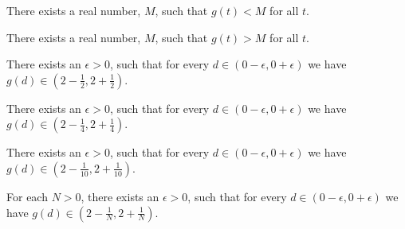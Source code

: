 \documentclass{ximera}
\begin{document}
\begin{exercise}
\begin{question} 

There exists a real number, $M$, such that $g(t) < M$ for all $t$.
\begin{multipleChoice}
\end{multipleChoice}

\end{question}





\begin{question} 

There exists a real number, $M$, such that $g(t) > M$ for all $t$.
\begin{multipleChoice}
\end{multipleChoice}

\end{question}










\begin{question} 

There exists an $\epsilon > 0$, such that for every $d \in (0-\epsilon, 0+\epsilon)$ we have $g(d) \in \left( 2-\frac{1}{2}, 2+\frac{1}{2} \right)$.
\begin{multipleChoice}
\end{multipleChoice}



There exists an $\epsilon > 0$, such that for every $d \in (0-\epsilon, 0+\epsilon)$ we have $g(d) \in \left( 2-\frac{1}{4}, 2+\frac{1}{4} \right)$.
\begin{multipleChoice}
\end{multipleChoice}




There exists an $\epsilon > 0$, such that for every $d \in (0-\epsilon, 0+\epsilon)$ we have $g(d) \in \left( 2-\frac{1}{10}, 2+\frac{1}{10} \right)$.
\begin{multipleChoice}
\end{multipleChoice}





For each $N > 0$, there exists an $\epsilon > 0$, such that for every $d \in (0-\epsilon, 0+\epsilon)$ we have $g(d) \in \left( 2-\frac{1}{N}, 2+\frac{1}{N} \right)$.
\begin{multipleChoice}
\end{multipleChoice}




\end{question}
\end{exercise}
\end{document}

